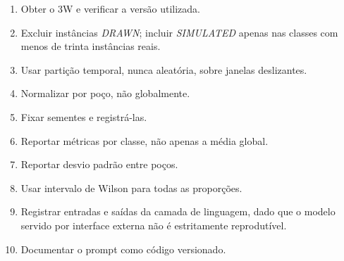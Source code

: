 \begin{enumerate}[leftmargin=*,itemsep=0.25em]
  \item Obter o 3W e verificar a versão utilizada.
  \item Excluir instâncias \emph{DRAWN}; incluir \emph{SIMULATED} apenas nas classes com
        menos de trinta instâncias reais.
  \item Usar partição temporal, nunca aleatória, sobre janelas deslizantes.
  \item Normalizar por poço, não globalmente.
  \item Fixar sementes e registrá-las.
  \item Reportar métricas por classe, não apenas a média global.
  \item Reportar desvio padrão entre poços.
  \item Usar intervalo de Wilson para todas as proporções.
  \item Registrar entradas e saídas da camada de linguagem, dado que o modelo servido por
        interface externa não é estritamente reprodutível.
  \item Documentar o prompt como código versionado.
\end{enumerate}
